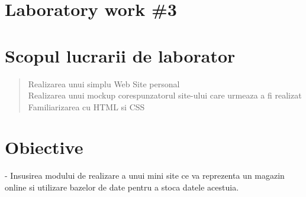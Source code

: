 \section*{Laboratory work \#3}

\section{Scopul lucrarii de laborator}

\begin{quote}
	\begin{description}
Realizarea unui simplu Web Site personal\\
Realizarea unui mockup corespunzatorul site-ului care urmeaza a fi realizat\\
Familiarizarea cu HTML si CSS\\
	\end{description}
\end{quote}
\section{Obiective}

- Insusirea modului de realizare a unui mini site ce va reprezenta un magazin online si utilizare bazelor de date pentru a stoca datele acestuia.


\clearpage